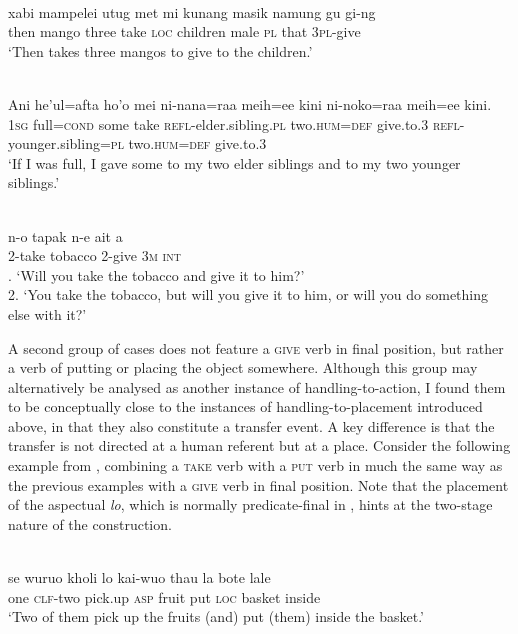 \ea 
{}\\
\gll xabi mampelei utug met mi kunang masik namung gu gi-ng \\
then mango three take \textsc{loc} children male \textsc{pl} that 3\textsc{pl}-give \\
\glft `Then takes three mangos to give to the children.'\\ 
\z

\ea \label{Makalero_6}
\\
\gll Ani he’ul=afta ho’o mei ni-nana=raa meih=ee kini ni-noko=raa meih=ee kini. \\
1\textsc{sg} full=\textsc{cond} some take \textsc{refl}-elder.sibling.\textsc{pl} two.\textsc{hum}=\textsc{def} give.to.3 \textsc{refl}-younger.sibling=\textsc{pl} two.\textsc{hum}=\textsc{def} give.to.3 \\
\glft ‘If I was full, I gave some to my two elder siblings and to my two younger
siblings.’ \\ 
\z

\ea \label{Maybrat_77}
\\
\gll n-o tapak n-e ait a \\
2-take tobacco 2-give 3\textsc{m} \textsc{int} \\
. `Will you take the tobacco and give it to him?' \\ 2. `You take the tobacco, but will you give it to him, or will you do something else with it?' \\ 
\z

A second group of cases does not feature a \textsc{give} verb in final position, but rather a verb of putting or placing the object somewhere. Although this group may alternatively be analysed as another instance of handling-to-action, I found them to be conceptually close to the instances of handling-to-placement introduced above, in that they also constitute a transfer event. A key difference is that the transfer is not directed at a human referent but at a place. Consider the following example from , combining a \textsc{take} verb with a \textsc{put} verb in much the same way as the previous examples with a \textsc{give} verb in final position. Note that the placement of the aspectual \textit{lo}, which is normally predicate-final in , hints at the two-stage nature of the construction.

\ea \label{WMHP058}
\\
\gll se wuruo kholi lo kai-wuo thau la bote lale \\
one \textsc{clf}-two pick.up \textsc{asp} fruit put \textsc{loc} basket inside \\
\glft `Two of them pick up the fruits (and) put (them) inside the basket.'\\ 
\z

